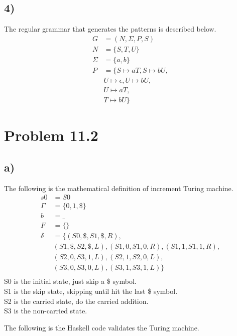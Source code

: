 \documentclass{article}
\begin{document}
\subsection*{4)}
The regular grammar that generates the patterns is described below.
\begin{align*}
    G &= (N, \Sigma, P, S) \\
    N &= \{S, T, U \} \\
    \Sigma &= \{a, b\} \\
    P &= \{ S \mapsto aT, S \mapsto bU, \\
    &U \mapsto \epsilon, U \mapsto bU, \\
    &U \mapsto aT, \\
    &T \mapsto bU \}
\end{align*}

\section*{Problem 11.2}
\subsection*{a)}
The following is the mathematical definition of increment Turing machine.
\begin{align*}
    s0 &= S0 \\
    \Gamma &= \{ 0, 1, \$ \} \\
    b &= \_ \\
    F &= \{ \} \\
    \delta &= \{ (S0, \$, S1, \$, R), \\
    &(S1, \$, S2, \$, L), (S1, 0, S1, 0, R), (S1, 1, S1, 1, R), \\
    &(S2, 0, S3, 1, L), (S2, 1, S2, 0, L), \\
    &(S3, 0, S3, 0, L), (S3, 1, S3, 1, L) \} \\
\end{align*}
S0 is the initial state, just skip a \$ symbol. \\
S1 is the skip state, skipping until hit the last \$ symbol. \\
S2 is the carried state, do the carried addition. \\
S3 is the non-carried state.

The following is the Haskell code validates the Turing machine.
\inputminted{Haskell}{turing_inc.hs}
\end{document}
